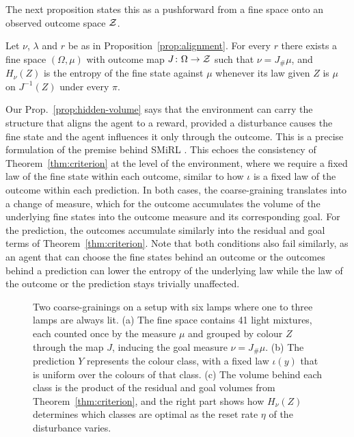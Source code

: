 The next proposition states this as a pushforward from a fine space onto an observed outcome space $\mathcal Z$.
\begin{proposition}\label{prop:hidden-volume}
  Let $\nu$, $\lambda$ and $r$ be as in Proposition~\ref{prop:alignment}.
  For every $r$ there exists a fine space $(\Omega, \mu)$ with outcome map $J\colon \Omega \to \mathcal Z$ such that $\nu = J_\#\mu$, and $H_\nu(Z)$ is the entropy of the fine state against $\mu$ whenever its law given $Z$ is $\mu$ on $J^{-1}(Z)$ under every $\pi$.
\end{proposition}
Our Prop.~\ref{prop:hidden-volume} says that the environment can carry the structure that aligns the agent to a reward, provided a disturbance causes the fine state and the agent influences it only through the outcome.
This is a precise formulation of the premise behind SMiRL \citep{Berseth-smirl21}.
This echoes the consistency of Theorem~\ref{thm:criterion} at the level of the environment, where we require a fixed law of the fine state within each outcome, similar to how $\iota$ is a fixed law of the outcome within each prediction.
In both cases, the coarse-graining translates into a change of measure, which for the outcome accumulates the volume of the underlying fine states into the outcome measure and its corresponding goal.
For the prediction, the outcomes accumulate similarly into the residual and goal terms of Theorem~\ref{thm:criterion}.
Note that both conditions also fail similarly, as an agent that can choose the fine states behind an outcome or the outcomes behind a prediction can lower the entropy of the underlying law while the law of the outcome or the prediction stays trivially unaffected.

\begin{figure}[t]
\centering

\caption{
Two coarse-grainings on a setup with six lamps where one to three lamps are always lit.
(a) The fine space contains 41 light mixtures, each counted once by the measure $\mu$ and grouped by colour $Z$ through the map $J$, inducing the goal measure $\nu = J_\#\mu$.
(b) The prediction $Y$ represents the colour class, with a fixed law $\iota(y)$ that is uniform over the colours of that class.
(c) The volume behind each class is the product of the residual and goal volumes from Theorem~\ref{thm:criterion}, and the right part shows how $H_\nu(Z)$ determines which classes are optimal as the reset rate $\eta$ of the disturbance varies.
}
\label{fig:lamps}
\end{figure}

